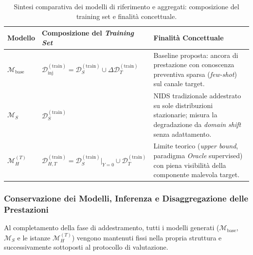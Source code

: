 \begin{table}[H]
    \centering
    \small
    \caption{Sintesi comparativa dei modelli di riferimento e aggregati: composizione del training set e finalità concettuale.}
    \label{tab:modelli_aggregati}
    \begin{tabularx}{\textwidth}{l l >{\raggedright\arraybackslash}X}
        \toprule
        \textbf{Modello} & \textbf{Composizione del \textit{Training Set}} & \textbf{Finalità Concettuale} \\
        \midrule
        $\mathcal{M}_{\text{base}}$ &
        $\mathcal{D}_{\text{inj}}^{(\text{train})} = \mathcal{D}_{S}^{(\text{train})} \cup \Delta \mathcal{D}_{T}^{(\text{train})}$ &
        Baseline proposta: ancora di prestazione con conoscenza preventiva sparsa (\textit{few-shot}) sul canale target. \\
        \addlinespace
        $\mathcal{M}_{S}$ &
        $\mathcal{D}_{S}^{(\text{train})}$ &
        NIDS tradizionale addestrato su sole distribuzioni stazionarie; misura la degradazione da \textit{domain shift} senza adattamento. \\
        \addlinespace
        $\mathcal{M}_{H}^{(T)}$ &
        $\mathcal{D}_{H,T}^{(\text{train})} = \mathcal{D}_{S}^{(\text{train})}\big|_{Y=0} \cup \mathcal{D}_{T}^{(\text{train})}$ &
        Limite teorico (\textit{upper bound}, paradigma \textit{Oracle} supervised) con piena visibilità della componente malevola target. \\
        \bottomrule
    \end{tabularx}
\end{table}

\subsubsection{Conservazione dei Modelli, Inferenza e Disaggregazione delle Prestazioni}
\label{subsubsec:persistenza_aggregati}
Al completamento della fase di addestramento, tutti i modelli generati ($\mathcal{M}_{\text{base}}$, $\mathcal{M}_{S}$ e le istanze $\mathcal{M}_{H}^{(T)}$) vengono mantenuti fissi nella propria struttura e successivamente sottoposti al protocollo di valutazione.

